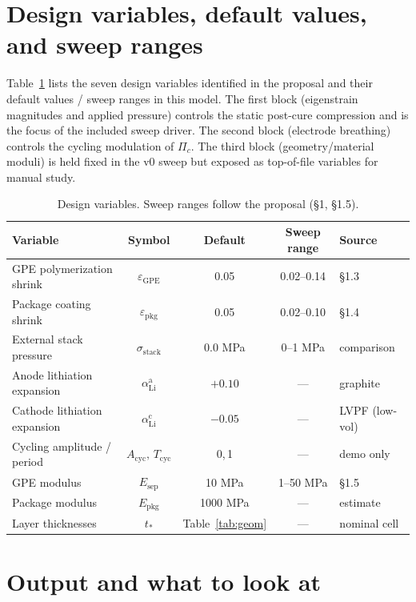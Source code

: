 \documentclass[11pt,letterpaper]{article}
\begin{document}
\section{Design variables, default values, and sweep ranges}
\label{sec:design}

Table~\ref{tab:design-vars} lists the seven design variables identified
in the proposal and their default values / sweep ranges in this model.
The first block (eigenstrain magnitudes and applied pressure) controls
the static post-cure compression and is the focus of the included sweep
driver.  The second block (electrode breathing) controls the cycling
modulation of $\Pi_c$.  The third block (geometry/material moduli) is
held fixed in the v0 sweep but exposed as top-of-file variables for
manual study.

\begin{table}[H]
\centering
\caption{Design variables. Sweep ranges follow the proposal (\S1, \S1.5).}
\label{tab:design-vars}
\begin{tabular}{lcccl}
\toprule
Variable & Symbol & Default & Sweep range & Source \\
\midrule
GPE polymerization shrink     & $\varepsilon_{\text{GPE}}$  & 0.05 & 0.02--0.14 & \S1.3 \\
Package coating shrink        & $\varepsilon_{\text{pkg}}$  & 0.05 & 0.02--0.10 & \S1.4 \\
External stack pressure       & $\sigma_{\text{stack}}$     & 0.0 MPa  & 0--1 MPa & comparison \\
\midrule
Anode lithiation expansion    & $\alpha_{\text{Li}}^{\text{a}}$ & $+0.10$ & --- & graphite \\
Cathode lithiation expansion  & $\alpha_{\text{Li}}^{\text{c}}$ & $-0.05$ & --- & LVPF (low-vol) \\
Cycling amplitude / period    & $A_{\text{cyc}},\,T_{\text{cyc}}$ & 0,\,1 & --- & demo only \\
\midrule
GPE modulus                   & $E_{\text{sep}}$            & 10 MPa    & 1--50 MPa  & \S1.5 \\
Package modulus               & $E_{\text{pkg}}$            & 1000 MPa  & ---       & estimate \\
Layer thicknesses             & $t_*$                       & Table~\ref{tab:geom}  & --- & nominal cell \\
\bottomrule
\end{tabular}
\end{table}

\section{Output and what to look at}
\end{document}
